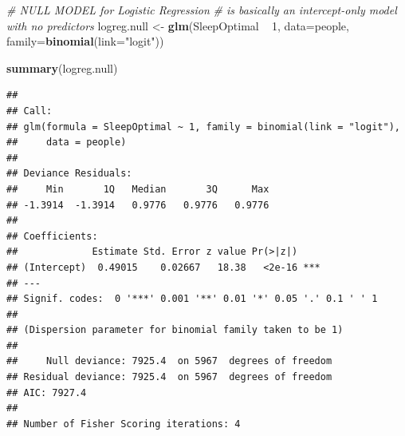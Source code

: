 \documentclass[]{article}
\newenvironment{Shaded}{\begin{snugshade}}{\end{snugshade}}
\newcommand{\KeywordTok}[1]{\textcolor[rgb]{0.13,0.29,0.53}{\textbf{{#1}}}}
\newcommand{\DataTypeTok}[1]{\textcolor[rgb]{0.13,0.29,0.53}{{#1}}}
\newcommand{\DecValTok}[1]{\textcolor[rgb]{0.00,0.00,0.81}{{#1}}}
\newcommand{\StringTok}[1]{\textcolor[rgb]{0.31,0.60,0.02}{{#1}}}
\newcommand{\CommentTok}[1]{\textcolor[rgb]{0.56,0.35,0.01}{\textit{{#1}}}}
\newcommand{\NormalTok}[1]{{#1}}
\begin{document}
\begin{Shaded}
\begin{Highlighting}[]
\CommentTok{# NULL MODEL for Logistic Regression }
\CommentTok{# is basically an intercept-only model with no predictors}
\NormalTok{logreg.null <-}\StringTok{ }\KeywordTok{glm}\NormalTok{(SleepOptimal ~}\StringTok{ }\DecValTok{1}\NormalTok{, }
                   \DataTypeTok{data=}\NormalTok{people, }
                   \DataTypeTok{family=}\KeywordTok{binomial}\NormalTok{(}\DataTypeTok{link=}\StringTok{"logit"}\NormalTok{))}

\KeywordTok{summary}\NormalTok{(logreg.null)}
\end{Highlighting}
\end{Shaded}

\begin{verbatim}
## 
## Call:
## glm(formula = SleepOptimal ~ 1, family = binomial(link = "logit"), 
##     data = people)
## 
## Deviance Residuals: 
##     Min       1Q   Median       3Q      Max  
## -1.3914  -1.3914   0.9776   0.9776   0.9776  
## 
## Coefficients:
##             Estimate Std. Error z value Pr(>|z|)    
## (Intercept)  0.49015    0.02667   18.38   <2e-16 ***
## ---
## Signif. codes:  0 '***' 0.001 '**' 0.01 '*' 0.05 '.' 0.1 ' ' 1
## 
## (Dispersion parameter for binomial family taken to be 1)
## 
##     Null deviance: 7925.4  on 5967  degrees of freedom
## Residual deviance: 7925.4  on 5967  degrees of freedom
## AIC: 7927.4
## 
## Number of Fisher Scoring iterations: 4
\end{verbatim}

\begin{Shaded}
\end{Shaded}
\end{document}
